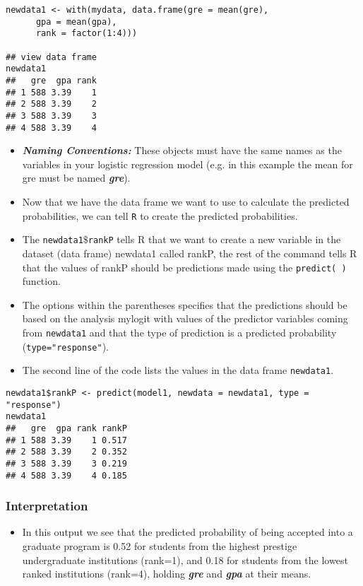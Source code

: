 \documentclass[]{article}
\begin{document}
\begin{framed}
\begin{verbatim}
newdata1 <- with(mydata, data.frame(gre = mean(gre), 
	  gpa = mean(gpa), 
	  rank = factor(1:4)))

## view data frame
newdata1
##   gre  gpa rank
## 1 588 3.39    1
## 2 588 3.39    2
## 3 588 3.39    3
## 4 588 3.39    4
\end{verbatim}
\end{framed}
\begin{itemize}
\item \textbf{\textit{Naming Conventions:}} These objects must have the same names as the variables in your logistic regression model (e.g. in this example the mean for gre must be named \textbf{\textit{gre}}). 
\item Now that we have the data frame we want to use to calculate the predicted probabilities, we can tell \texttt{R} to create the predicted probabilities. 
\end{itemize}
\newpage
\begin{itemize}
\item The \texttt{newdata1$\$$rankP} tells R that we want to create a new variable in the dataset (data frame) newdata1 called rankP, the rest of the command tells R that the values of rankP should be predictions made using the \texttt{predict( )} function. 
\item The options within the parentheses specifies that the predictions should be based on the analysis mylogit with values of the predictor variables coming from \texttt{newdata1} and that the type of prediction is a predicted probability (\texttt{type="response"}). 
\item The second line of the code lists the values in the data frame \texttt{newdata1}. 
\end{itemize}
\begin{verbatim}
newdata1$rankP <- predict(model1, newdata = newdata1, type = "response")
newdata1
##   gre  gpa rank rankP
## 1 588 3.39    1 0.517
## 2 588 3.39    2 0.352
## 3 588 3.39    3 0.219
## 4 588 3.39    4 0.185

\end{verbatim}
\subsubsection{Interpretation}
\begin{itemize} 
\item In this output we see that the predicted probability of being accepted into a graduate program is 0.52 for students from the highest prestige undergraduate institutions (rank=1), and 0.18 for students from the lowest ranked institutions (rank=4), holding \textbf{\textit{gre}} and \textbf{\textit{gpa}} at their means. 
\end{itemize}
\newpage
\end{document}
